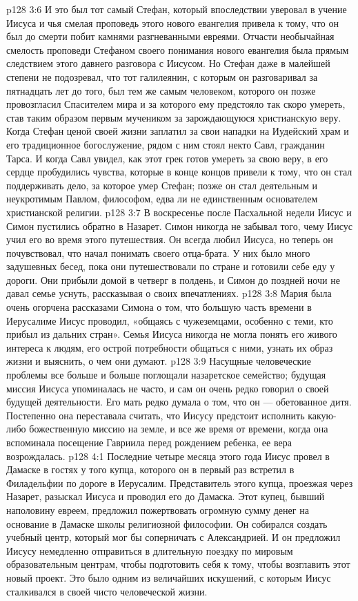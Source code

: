 \vs p128 3:6 И это был тот самый Стефан, который впоследствии уверовал в учение Иисуса и чья смелая проповедь этого нового евангелия привела к тому, что он был до смерти побит камнями разгневанными евреями. Отчасти необычайная смелость проповеди Стефаном своего понимания нового евангелия была прямым следствием этого давнего разговора с Иисусом. Но Стефан даже в малейшей степени не подозревал, что тот галилеянин, с которым он разговаривал за пятнадцать лет до того, был тем же самым человеком, которого он позже провозгласил Спасителем мира и за которого ему предстояло так скоро умереть, став таким образом первым мучеником за зарождающуюся христианскую веру. Когда Стефан ценой своей жизни заплатил за свои нападки на Иудейский храм и его традиционное богослужение, рядом с ним стоял некто Савл, гражданин Тарса. И когда Савл увидел, как этот грек готов умереть за свою веру, в его сердце пробудились чувства, которые в конце концов привели к тому, что он стал поддерживать дело, за которое умер Стефан; позже он стал деятельным и неукротимым Павлом, философом, едва ли не единственным основателем христианской религии.
\vs p128 3:7 \pc В воскресенье после Пасхальной недели Иисус и Симон пустились обратно в Назарет. Симон никогда не забывал того, чему Иисус учил его во время этого путешествия. Он всегда любил Иисуса, но теперь он почувствовал, что начал понимать своего отца\hyp{}брата. У них было много задушевных бесед, пока они путешествовали по стране и готовили себе еду у дороги. Они прибыли домой в четверг в полдень, и Симон до поздней ночи не давал семье уснуть, рассказывая о своих впечатлениях.
\vs p128 3:8 Мария была очень огорчена рассказами Симона о том, что большую часть времени в Иерусалиме Иисус проводил, «общаясь с чужеземцами, особенно с теми, кто прибыл из дальних стран». Семья Иисуса никогда не могла понять его живого интереса к людям, его острой потребности общаться с ними, узнать их образ жизни и выяснить, о чем они думают.
\vs p128 3:9 \pc Насущные человеческие проблемы все больше и больше поглощали назаретское семейство; будущая миссия Иисуса упоминалась не часто, и сам он очень редко говорил о своей будущей деятельности. Его мать редко думала о том, что он --- обетованное дитя. Постепенно она переставала считать, что Иисусу предстоит исполнить какую\hyp{}либо божественную миссию на земле, и все же время от времени, когда она вспоминала посещение Гавриила перед рождением ребенка, ее вера возрождалась.
\vs p128 4:1 Последние четыре месяца этого года Иисус провел в Дамаске в гостях у того купца, которого он в первый раз встретил в Филадельфии по дороге в Иерусалим. Представитель этого купца, проезжая через Назарет, разыскал Иисуса и проводил его до Дамаска. Этот купец, бывший наполовину евреем, предложил пожертвовать огромную сумму денег на основание в Дамаске школы религиозной философии. Он собирался создать учебный центр, который мог бы соперничать с Александрией. И он предложил Иисусу немедленно отправиться в длительную поездку по мировым образовательным центрам, чтобы подготовить себя к тому, чтобы возглавить этот новый проект. Это было одним из величайших искушений, с которым Иисус сталкивался в своей чисто человеческой жизни.
